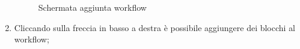 \begin{enumerate}
	\begin{figure}[!ht]
		\centering
		\caption{Schermata aggiunta workflow}
	\end{figure}

\newpage
\item Cliccando sulla freccia in basso a destra è possibile aggiungere dei blocchi al workflow;


\end{enumerate}
